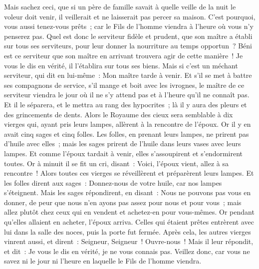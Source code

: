 \begin{multicols}{2}
Mais sachez ceci, que si un père de famille savait à quelle veille de la nuit le voleur doit venir, il veillerait et ne laisserait pas percer sa maison.
C'est pourquoi, vous aussi tenez-vous prêts~; car le Fils de l'homme viendra à l'heure où vous n'y penserez pas.
Quel est donc le serviteur fidèle et prudent, que son maître a établi sur tous ses serviteurs, pour leur donner la nourriture au temps opportun~?
Béni est ce serviteur que son maître en arrivant trouvera agir de cette manière~!
Je vous le dis en vérité, il l'établira sur tous ses biens.
Mais si c'est un méchant serviteur, qui dit en lui-même~: Mon maître tarde à venir.
Et s'il se met à battre ses compagnons de service, s'il mange et boit avec les ivrognes,
le maître de ce serviteur viendra le jour où il ne s'y attend pas et à l'heure qu'il ne connaît pas.
Et il le séparera, et le mettra au rang des hypocrites~; là il y aura des pleurs et des grincements de dents.
\VerseOne{}Alors le Royaume des cieux sera semblable à dix vierges qui, ayant pris leurs lampes, allèrent à la rencontre de l'époux.
Or il y en avait cinq sages et cinq folles.
Les folles, en prenant leurs lampes, ne prirent pas d'huile avec elles~;
mais les sages prirent de l'huile dans leurs vases avec leurs lampes.
Et comme l'époux tardait à venir, elles s'assoupirent et s'endormirent toutes.
Or à minuit il se fit un cri, disant~: Voici, l'époux vient, allez à sa rencontre~!
Alors toutes ces vierges se réveillèrent et préparèrent leurs lampes.
Et les folles dirent aux sages~: Donnez-nous de votre huile, car nos lampes s'éteignent.
Mais les sages répondirent, en disant~: Nous ne pouvons pas vous en donner, de peur que nous n'en ayons pas assez pour nous et pour vous~; mais allez plutôt chez ceux qui en vendent et achetez-en pour vous-mêmes.
Or pendant qu'elles allaient en acheter, l'époux arriva. Celles qui étaient prêtes entrèrent avec lui dans la salle des noces, puis la porte fut fermée.
Après cela, les autres vierges vinrent aussi, et dirent~: Seigneur, Seigneur~! Ouvre-nous~!
Mais il leur répondit, et dit~: Je vous le dis en vérité, je ne vous connais pas.
Veillez donc, car vous ne savez ni le jour ni l'heure en laquelle le Fils de l'homme viendra.

\end{multicols}
